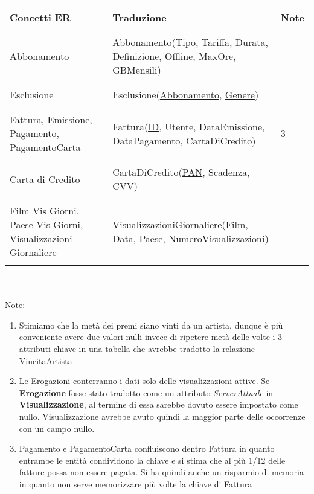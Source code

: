 \documentclass{article}
\begin{document}
\begin{tabular}{|C{2.7cm}|C{8cm}|C{0.8cm}|}
\hline
& & \\
    \textbf{Concetti ER} & \textbf{Traduzione} & \textbf{Note} \\
& & \\
\hline 
& & \\
    Abbonamento & Abbonamento(\underline{Tipo}, Tariffa, Durata, Definizione, Offline, MaxOre, GBMensili) & \\
& & \\
\hline
& & \\
    Esclusione & Esclusione(\underline{Abbonamento}, \underline{Genere}) & \\
& & \\
\hline
& & \\
    Fattura, Emissione, Pagamento, PagamentoCarta & Fattura(\underline{ID}, Utente, DataEmissione, DataPagamento, CartaDiCredito) & 3\\
& & \\
\hline
& & \\
    Carta di Credito & CartaDiCredito(\underline{PAN}, Scadenza, CVV) & \\
& & \\
\hline
& & \\
    Film Vis Giorni, Paese Vis Giorni, Visualizzazioni Giornaliere & VisualizzazioniGiornaliere(\underline{Film}, \underline{Data}, \underline{Paese}, NumeroVisualizzazioni) & \\
& & \\
\hline
\end{tabular} \\ \\



Note: \\ 
\begin{enumerate}
    \item Stimiamo che la metà dei premi siano vinti da un artista, dunque è più conveniente avere due valori nulli invece di ripetere metà delle volte i 3 attributi chiave in una tabella che avrebbe tradotto la relazione VincitaArtista
    
    \item Le Erogazioni conterranno i dati solo delle visualizzazioni attive. Se \textbf{Erogazione} fosse stato tradotto come un attributo \textit{ServerAttuale} in \textbf{Visualizzazione}, al termine di essa sarebbe dovuto essere impostato come nullo. Visualizzazione avrebbe avuto quindi la maggior parte delle occorrenze con un campo nullo.
    
    \item Pagamento e PagamentoCarta confluiscono dentro Fattura in quanto entrambe le entità condividono la chiave e si stima che al più 1/12 delle fatture possa non essere pagata. Si ha quindi anche un risparmio di memoria in quanto non serve memorizzare più volte la chiave di Fattura
\end{enumerate}
\end{document}
